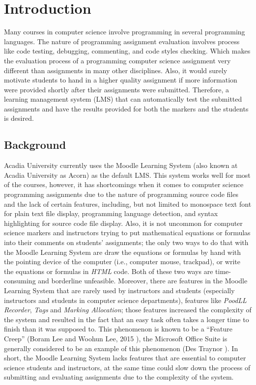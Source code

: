 

\chapter{Introduction}
\label{chap:INTRO}

Many courses in computer science involve programming in several programming
languages.
The nature of programming assignment evaluation
involves process like code testing, debugging, commenting, and code styles
checking.
Which makes the evaluation process of a programming computer science assignment
very different than assignments in many other disciplines.
Also, it would surely motivate students to hand in a higher quality assignment
if more information were provided shortly after their assignments were
submitted.
Therefore, a learning management system (LMS) that can automatically test the
submitted assignments and have the results provided for both the markers and
the students is desired.

\section{Background}

Acadia University currently uses the Moodle Learning System (also known at 
Acadia University as Acorn) as the default LMS.
This system works well for most of the courses, however, it has shortcomings
when it comes to computer science programming assignments due to
the nature of programming source code files and the lack of certain
features, including, but not limited to monospace text font for plain text
file display, programming language detection, and syntax
highlighting for source code file display.
Also, it is not uncommon for computer science markers and instructors
trying to put mathematical equations or formulas into their comments on
students' assignments; the only two ways to do that with the Moodle
Learning System are draw the equations or formulas by hand with the
pointing device of the computer (i.e., computer mouse, trackpad), or write
the equations or formulas in \emph{HTML} code. Both of these two ways are
time-consuming and borderline unfeasible.
Moreover, there are features in the Moodle Learning System that are rarely
used by instructors and students (especially instructors and students in
computer science departments), features like \emph{PoodLL Recorder},
\emph{Tags} and \emph{Marking Allocation};
those features increased the
complexity of the system and resulted in the fact that an easy task 
often takes a longer time to finish than it was supposed to. This phenomenon
is known to be a ``Feature Creep''  (Boram Lee and Woohun Lee, 2015 
\cite{featureCreep}), the Microsoft Office Suite is generally
considered to be an example of this phenomenon (Des Traynor 
\cite{msFeatureCreep}).
In short, the Moodle Learning System lacks features that are essential
to computer science students and instructors, at the same time could slow
down the process of submitting and evaluating assignments due to the complexity
of the system.

